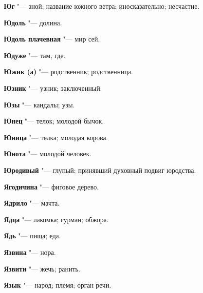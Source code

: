 \begin{mymulticols}{2}
\noindent\textbf{Юг} "--- зной; название южного ветра; иносказательно; несчастие. 




\noindent\textbf{Юдоль} "--- долина. 




\noindent\textbf{Юдоль плачевная} "--- мир сей. 




\noindent\textbf{Юдуже} "--- там, где. 




\noindent\textbf{Южик (а)} "--- родственник; родственница. 




\noindent\textbf{Юзник} "--- узник; заключенный. 




\noindent\textbf{Юзы} "--- кандалы; узы. 




\noindent\textbf{Юнец} "--- телок; молодой бычок. 




\noindent\textbf{Юница} "--- телка; молодая корова. 




\noindent\textbf{Юнота} "--- молодой человек. 




\noindent\textbf{Юродивый} "--- глупый; принявший духовный подвиг юродства. 




\bukvaending






\noindent\textbf{Ягодичина} "--- фиговое дерево. 




\noindent\textbf{Ядрило} "--- мачта. 




\noindent\textbf{Ядца} "--- лакомка; гурман; обжора. 




\noindent\textbf{Ядь} "--- пища; еда. 




\noindent\textbf{Язвина} "--- нора. 




\noindent\textbf{Язвити} "--- жечь; ранить. 




\noindent\textbf{Язык} "--- народ; племя; орган речи. 





\end{mymulticols}
